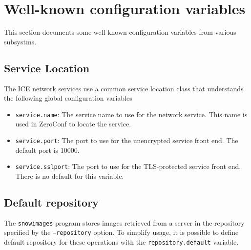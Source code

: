 \section{Well-known configuration variables}
This section documents some well known configuration variables from 
various subsystms.
\subsection{Service Location}
The ICE network services use a common service location class that
understands the following global configuration variables
\begin{itemize}
\item
\texttt{service.name}:
The service name to use for the network service.
This name is used in ZeroConf to locate the service.
\item
\texttt{service.port}:
The port to use for the unencrypted service front end.
The default port is 10000.
\item
\texttt{service.sslport}:
The port to use for the TLS-protected service front end.
There is no default for this variable.
\end{itemize}

\subsection{Default repository}
The \texttt{snowimages} program stores images retrieved from a server
in the repository specified by the \texttt{--repository} option.
To simplify usage, it is possible to define default repository
for these operations with the \texttt{repository.default} variable.



